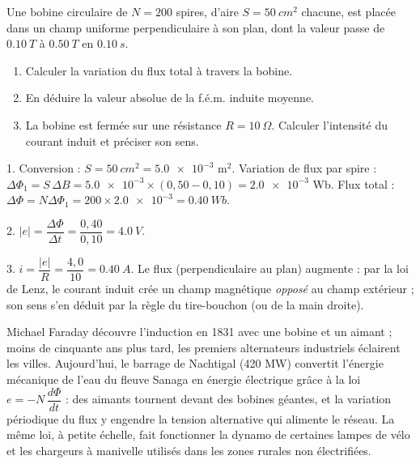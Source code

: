 \documentclass[11pt]{article}
\begin{document}
\begin{exercice}
Une bobine circulaire de $N = 200$ spires, d'aire $S = \SI{50}{cm^2}$ chacune, est placée dans un champ uniforme perpendiculaire à son plan, dont la valeur passe de $\SI{0,10}{T}$ à $\SI{0,50}{T}$ en $\SI{0,10}{s}$.
\begin{enumerate}
\item Calculer la variation du flux total à travers la bobine.
\item En déduire la valeur absolue de la f.é.m. induite moyenne.
\item La bobine est fermée sur une résistance $R = \SI{10}{\Omega}$. Calculer l'intensité du courant induit et préciser son sens.
\end{enumerate}
\end{exercice}

\begin{corrige}[Exercice]
1. Conversion : $S = \SI{50}{cm^2} = \num{5,0e-3}$ m$^2$. Variation de flux par spire : $\Delta \Phi_1 = S \, \Delta B = \num{5,0e-3} \times (0{,}50 - 0{,}10) = \num{2,0e-3}$ Wb. Flux total : $\Delta \Phi = N \Delta \Phi_1 = 200 \times \num{2,0e-3} = \SI{0,40}{Wb}$.

2. $|e| = \dfrac{\Delta \Phi}{\Delta t} = \dfrac{0{,}40}{0{,}10} = \SI{4,0}{V}$.

3. $i = \dfrac{|e|}{R} = \dfrac{4{,}0}{10} = \SI{0,40}{A}$. Le flux (perpendiculaire au plan) augmente : par la loi de Lenz, le courant induit crée un champ magnétique \emph{opposé} au champ extérieur ; son sens s'en déduit par la règle du tire-bouchon (ou de la main droite).
\end{corrige}

\begin{savaistu}
Michael Faraday découvre l'induction en 1831 avec une bobine et un aimant ; moins de cinquante ans plus tard, les premiers alternateurs industriels éclairent les villes. Aujourd'hui, le barrage de Nachtigal (420 MW) convertit l'énergie mécanique de l'eau du fleuve Sanaga en énergie électrique grâce à la loi $e = -N\,\dfrac{d\Phi}{dt}$ : des aimants tournent devant des bobines géantes, et la variation périodique du flux y engendre la tension alternative qui alimente le réseau. La même loi, à petite échelle, fait fonctionner la dynamo de certaines lampes de vélo et les chargeurs à manivelle utilisés dans les zones rurales non électrifiées.
\end{savaistu}
\end{document}
